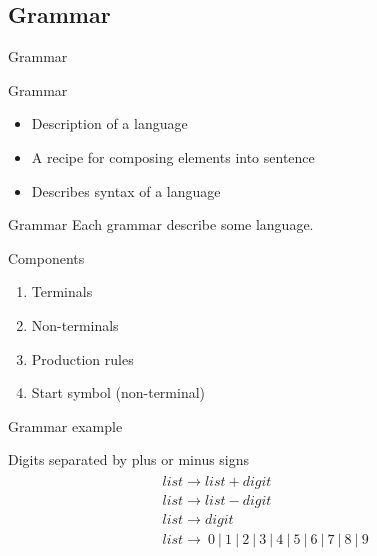 \documentclass{beamer}
\begin{document}
\subsection{Grammar}

\begin{frame}{Grammar}

\begin{block}{Grammar}
\begin{itemize}
\item Description of a language
\item A recipe for composing elements into sentence
\item Describes syntax of a language
\end{itemize}
\end{block}

\end{frame}

\begin{frame}{Grammar}
Each grammar describe some language.

\begin{block}{Components}
\begin{enumerate}
\item Terminals
\item Non-terminals
\item Production rules
\item Start symbol (non-terminal)
\end{enumerate}
\end{block}

\end{frame}

\begin{frame}{Grammar example}
\begin{examples}{Digits separated by plus or minus signs}
\begin{eqnarray*}
\begin{aligned}
& list \rightarrow list + digit \\
& list \rightarrow list - digit \\
& list \rightarrow digit \\
& list \rightarrow \ 0 \ | \ 1 \ | \ 2 \ | \ 3 \ | \ 4 \ | \ 5 \ | \ 6 \ | \ 7 \ | \ 8 \ | \ 9
\end{aligned}
\end{eqnarray*}
\end{examples}
\end{frame}
\end{document}
